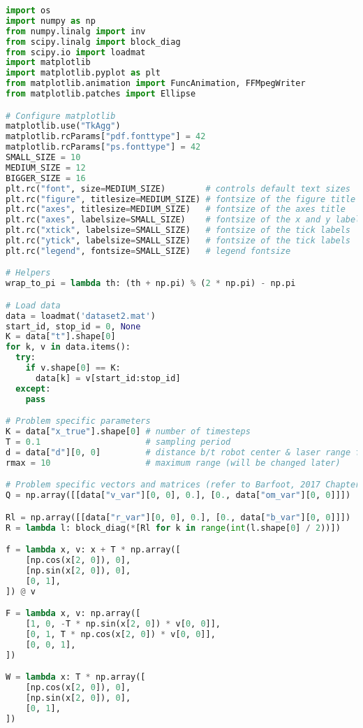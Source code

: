 \documentclass[a4paper]{article}
\begin{document}
\begin{lstlisting}[language=Python, basicstyle=\small]
import os
import numpy as np
from numpy.linalg import inv
from scipy.linalg import block_diag
from scipy.io import loadmat
import matplotlib
import matplotlib.pyplot as plt
from matplotlib.animation import FuncAnimation, FFMpegWriter
from matplotlib.patches import Ellipse

# Configure matplotlib
matplotlib.use("TkAgg")
matplotlib.rcParams["pdf.fonttype"] = 42
matplotlib.rcParams["ps.fonttype"] = 42
SMALL_SIZE = 10
MEDIUM_SIZE = 12
BIGGER_SIZE = 16
plt.rc("font", size=MEDIUM_SIZE)        # controls default text sizes
plt.rc("figure", titlesize=MEDIUM_SIZE) # fontsize of the figure title
plt.rc("axes", titlesize=MEDIUM_SIZE)   # fontsize of the axes title
plt.rc("axes", labelsize=SMALL_SIZE)    # fontsize of the x and y labels
plt.rc("xtick", labelsize=SMALL_SIZE)   # fontsize of the tick labels
plt.rc("ytick", labelsize=SMALL_SIZE)   # fontsize of the tick labels
plt.rc("legend", fontsize=SMALL_SIZE)   # legend fontsize

# Helpers
wrap_to_pi = lambda th: (th + np.pi) % (2 * np.pi) - np.pi

# Load data
data = loadmat('dataset2.mat')
start_id, stop_id = 0, None
K = data["t"].shape[0]
for k, v in data.items():
  try:
    if v.shape[0] == K:
      data[k] = v[start_id:stop_id]
  except:
    pass

# Problem specific parameters
K = data["x_true"].shape[0] # number of timesteps
T = 0.1                     # sampling period
d = data["d"][0, 0]         # distance b/t robot center & laser range finder
rmax = 10                   # maximum range (will be changed later)

# Problem specific vectors and matrices (refer to Barfoot, 2017 Chapter 4.2.3)
Q = np.array([[data["v_var"][0, 0], 0.], [0., data["om_var"][0, 0]]])

Rl = np.array([[data["r_var"][0, 0], 0.], [0., data["b_var"][0, 0]]])
R = lambda l: block_diag(*[Rl for k in range(int(l.shape[0] / 2))])

f = lambda x, v: x + T * np.array([
    [np.cos(x[2, 0]), 0],
    [np.sin(x[2, 0]), 0],
    [0, 1],
]) @ v

F = lambda x, v: np.array([
    [1, 0, -T * np.sin(x[2, 0]) * v[0, 0]],
    [0, 1, T * np.cos(x[2, 0]) * v[0, 0]],
    [0, 0, 1],
])

W = lambda x: T * np.array([
    [np.cos(x[2, 0]), 0],
    [np.sin(x[2, 0]), 0],
    [0, 1],
])


\end{lstlisting}
\end{document}
